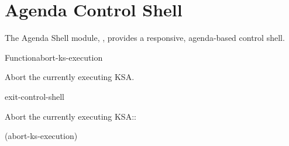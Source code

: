 \documentclass[10pt,twoside,english,pdftex]{article}
\begin{document}
\section{Agenda Control Shell}

%
%
The Agenda Shell module, , provides a responsive,
agenda-based control shell.

\W\entities
\T\clearpage
\T\renewcommand{\headrulewidth}{0.01pt}


\begin{functiondoc}{Function}{abort-ks-execution}{\noargs}
%

\fnsyntax

\fnpurpose Abort the currently executing KSA.

\fnpackage {}

\fnmodule {}

\begin{alsos}{exit-control-shell}
\end{alsos}

\fnexample
Abort the currently executing KSA::
\begin{example}
  (abort-ks-execution)
\end{example}

\end{functiondoc}

\end{document}
